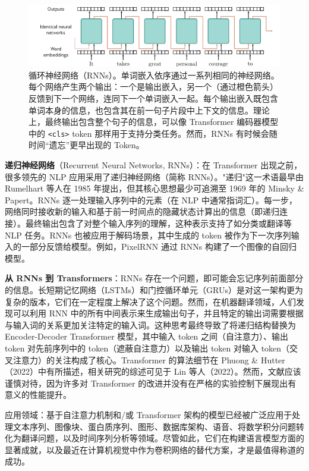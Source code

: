 \begin{figure}[ht!]
\centering
\includegraphics[width=0.7\linewidth]{png/chapter12/TransformerRNN.png}
\caption{循环神经网络（RNNs）。单词嵌入依序通过一系列相同的神经网络。每个网络产生两个输出：一个是输出嵌入，另一个（通过橙色箭头）反馈到下一个网络，连同下一个单词嵌入一起。每个输出嵌入既包含单词本身的信息，也包含其在前一句子片段中上下文的信息。理论上，最终输出包含整个句子的信息，可以像 Transformer 编码器模型中的 \texttt{\textless cls\textgreater} token 那样用于支持分类任务。然而，RNNs 有时候会随时间“遗忘”更早出现的 Token。}
\end{figure}


\textbf{递归神经网络}（Recurrent Neural Networks, RNNs）：在 Transformer 出现之前，很多领先的 NLP 应用采用了递归神经网络（简称 RNNs）。"递归"这一术语最早由 Rumelhart 等人在 1985 年提出，但其核心思想最少可追溯至 1969 年的 Minsky \& Papert。RNNs 逐一处理输入序列中的元素（在 NLP 中通常指词汇）。每一步，网络同时接收新的输入和基于前一时间点的隐藏状态计算出的信息（即递归连接）。最终输出包含了对整个输入序列的理解，这种表示支持了如分类或翻译等 NLP 任务。RNNs 也被应用于解码场景，其中生成的 token 被作为下一次序列输入的一部分反馈给模型。例如，PixelRNN 通过 RNNs 构建了一个图像的自回归模型。

\textbf{从 RNNs 到 Transformers}：RNNs 存在一个问题，即可能会忘记序列前面部分的信息。长短期记忆网络（LSTMs）和门控循环单元（GRUs）是对这一架构更为复杂的版本，它们在一定程度上解决了这个问题。然而，在机器翻译领域，人们发现可以利用 RNN 中的所有中间表示来生成输出句子，并且特定的输出词需要根据与输入词的关系更加关注特定的输入词。这种思考最终导致了将递归结构替换为 Encoder-Decoder Transformer 模型，其中输入 token 之间（自注意力）、输出 token 对先前序列中的 token（遮蔽自注意力）以及输出 token 对输入 token（交叉注意力）的关注构成了核心。Transformer 的算法细节在 Phuong \& Hutter（2022）中有所描述，相关研究的综述可见于 Lin 等人（2022）。然而，文献应该谨慎对待，因为许多对 Transformer 的改进并没有在严格的实验控制下展现出有意义的性能提升。

应用领域：基于自注意力机制和/或 Transformer 架构的模型已经被广泛应用于处理文本序列、图像块、蛋白质序列、图形、数据库架构、语音、将数学积分问题转化为翻译问题，以及时间序列分析等领域。尽管如此，它们在构建语言模型方面的显著成就，以及最近在计算机视觉中作为卷积网络的替代方案，才是最值得称道的成功。

